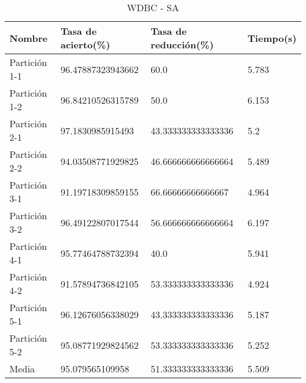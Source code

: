 \begin{table}[H]
	\centering
	\begin{tabular}{l|lll}
		Nombre        & Tasa de acierto(\%) & Tasa de reducción(\%) & Tiempo(s) \\ \hline
		Partición 1-1 & 96.47887323943662   & 60.0                  & 5.783     \\
		Partición 1-2 & 96.84210526315789   & 50.0                  & 6.153     \\
		Partición 2-1 & 97.1830985915493    & 43.333333333333336    & 5.2       \\
		Partición 2-2 & 94.03508771929825   & 46.666666666666664    & 5.489     \\
		Partición 3-1 & 91.19718309859155   & 66.66666666666667     & 4.964     \\
		Partición 3-2 & 96.49122807017544   & 56.666666666666664    & 6.197     \\
		Partición 4-1 & 95.77464788732394   & 40.0                  & 5.941     \\
		Partición 4-2 & 91.57894736842105   & 53.333333333333336    & 4.924     \\
		Partición 5-1 & 96.12676056338029   & 43.333333333333336    & 5.187     \\
		Partición 5-2 & 95.08771929824562   & 53.333333333333336    & 5.252     \\ \hline
		Media         & 95.079565109958     & 51.333333333333336    & 5.509    
	\end{tabular}
	\caption{WDBC - SA}
	\label{WDBC-SA}
\end{table}